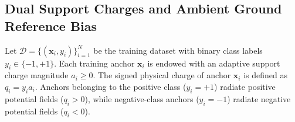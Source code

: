 \documentclass[times, review, 10pt]{elsarticle}
\begin{document}
\begin{table}[!htbp]
\centering
\scriptsize
\caption{Subspace Stacking Performance on Wisconsin Diagnostic Breast Cancer ($D=30$).}
\label{tab:subspace_stacking}
\end{table}

\subsection{Dual Support Charges and Ambient Ground Reference Bias}
Let $\mathcal{D} = \{(\mathbf{x}_i, y_i)\}_{i=1}^N$ be the training dataset with binary class labels $y_i \in \{-1, +1\}$. Each training anchor $\mathbf{x}_i$ is endowed with an adaptive support charge magnitude $a_i \ge 0$. The signed physical charge of anchor $\mathbf{x}_i$ is defined as $q_i = y_i a_i$. Anchors belonging to the positive class ($y_i = +1$) radiate positive potential fields ($q_i > 0$), while negative-class anchors ($y_i = -1$) radiate negative potential fields ($q_i < 0$).
\end{document}
